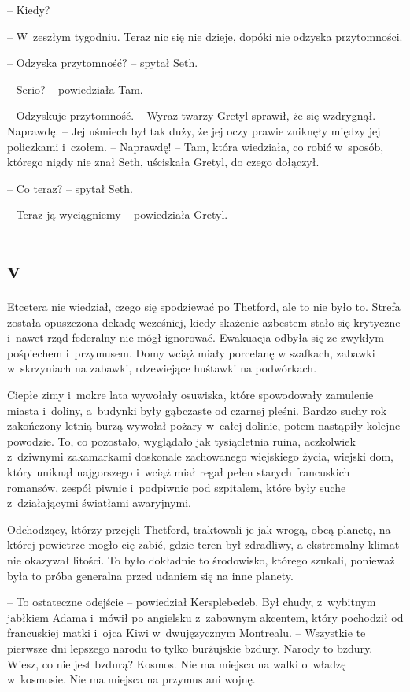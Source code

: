 \documentclass[oneside,polish,11pt,sfheadings]{mwbk}
\begin{document}
-- Kiedy?

-- W~zeszłym tygodniu. Teraz nic się nie dzieje, dopóki nie odzyska
przytomności.

-- Odzyska przytomność? -- spytał Seth.

-- Serio? -- powiedziała Tam.

-- Odzyskuje przytomność. -- Wyraz twarzy Gretyl sprawił, że się
wzdrygnął. -- Naprawdę. -- Jej uśmiech był tak duży, że jej oczy prawie
zniknęły między jej policzkami i~czołem. -- Naprawdę! -- Tam, która
wiedziała, co robić w~sposób, którego nigdy nie znał Seth, uściskała
Gretyl, do czego dołączył.

-- Co teraz? -- spytał Seth.

-- Teraz ją wyciągniemy -- powiedziała Gretyl.

\chapter*{v}

Etcetera nie wiedział, czego się spodziewać po Thetford, ale to nie było
to. Strefa została opuszczona dekadę wcześniej, kiedy skażenie azbestem
stało się krytyczne i~nawet rząd federalny nie mógł ignorować. Ewakuacja
odbyła się ze zwykłym pośpiechem i~przymusem. Domy wciąż miały porcelanę
w szafkach, zabawki w~skrzyniach na zabawki, rdzewiejące huśtawki na
podwórkach.

Ciepłe zimy i~mokre lata wywołały osuwiska, które spowodowały zamulenie
miasta i~doliny, a~budynki były gąbczaste od czarnej pleśni. Bardzo
suchy rok zakończony letnią burzą wywołał pożary w~całej dolinie, potem
nastąpiły kolejne powodzie. To, co pozostało, wyglądało jak tysiącletnia
ruina, aczkolwiek z~dziwnymi zakamarkami doskonale zachowanego
wiejskiego życia, wiejski dom, który uniknął najgorszego i~wciąż miał
regał pełen starych francuskich romansów, zespół piwnic i~podpiwnic pod
szpitalem, które były suche z~działającymi światłami awaryjnymi.

Odchodzący, którzy przejęli Thetford, traktowali je jak wrogą, obcą
planetę, na której powietrze mogło cię zabić, gdzie teren był zdradliwy,
a ekstremalny klimat nie okazywał litości. To było dokładnie to
środowisko, którego szukali, ponieważ była to próba generalna przed
udaniem się na inne planety.

-- To ostateczne odejście -- powiedział Kersplebedeb. Był chudy, z~wybitnym jabłkiem Adama i~mówił po angielsku z~zabawnym akcentem, który
pochodził od francuskiej matki i~ojca Kiwi w~dwujęzycznym Montrealu. -- Wszystkie te pierwsze dni lepszego narodu to tylko burżujskie bzdury.
Narody to bzdury. Wiesz, co nie jest bzdurą? Kosmos. Nie ma miejsca na
walki o~władzę w~kosmosie. Nie ma miejsca na przymus ani wojnę.
\end{document}
